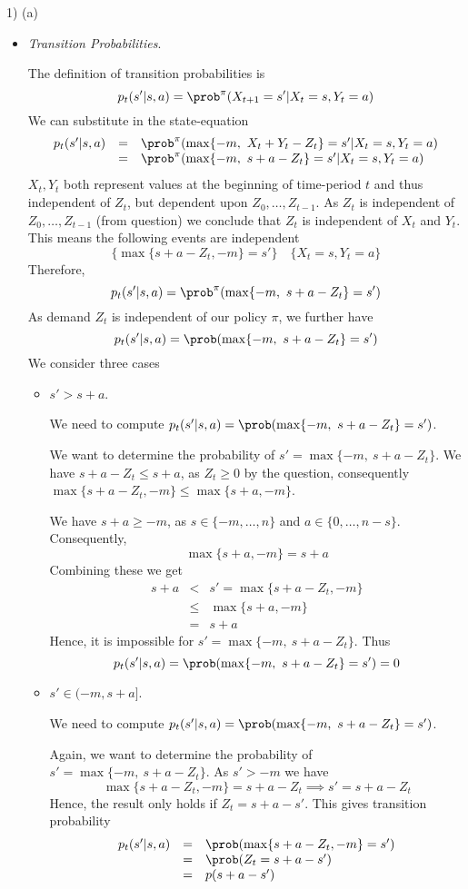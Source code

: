 \documentclass[11pt,a4paper]{article}
\begin{document}
\begin{answer}{1) (a)}
\begin{itemize}
    \item \textit{Transition Probabilities}.
    \par The definition of transition probabilities is
    \[ p_t(s'|s,a)=\prob^\pi(X_{t+1}=s'|X_t=s,Y_t=a) \]
    We can substitute in the state-equation
    \[\begin{array}{rcl}
      p_t(s'|s,a)&=&\prob^\pi(\max\{-m,\ X_t+Y_t-Z_t\}=s'|X_t=s,Y_t=a)\\
      &=&\prob^\pi(\max\{-m,\ s+a-Z_t\}=s'|X_t=s,Y_t=a)
    \end{array}\]
    $X_t,Y_t$ both represent values at the beginning of time-period $t$ and thus independent of $Z_t$, but dependent upon $Z_0,\dots,Z_{t-1}$. As $Z_t$ is independent of $Z_0,\dots,Z_{t-1}$ (from question) we conclude that $Z_t$ is independent of $X_t$ and $Y_t$. This means the following events are independent
    \[ \big\{\max\{s+a-Z_t,-m\}=s'\big\}\quad\big\{X_t=s,Y_t=a\big\} \]
    Therefore,
    \[ p_t(s'|s,a)=\prob^\pi(\max\{-m,\ s+a-Z_t\}=s') \]
    As demand $Z_t$ is independent of our policy $\pi$, we further have
    \[ p_t(s'|s,a)=\prob(\max\{-m,\ s+a-Z_t\}=s') \]
    We consider three cases
    \begin{itemize}
      \item $s'>s+a$.
      \par We need to compute $p_t(s'|s,a)=\prob(\max\{-m,\ s+a-Z_t\}=s')$.
      \par We want to determine the probability of $s'=\max\{-m,\ s+a-Z_t\}$. We have $s+a-Z_t\leq s+a$, as $Z_t\geq0$ by the question, consequently $\max\{s+a-Z_t,-m\}\leq\max\{s+a,-m\}$.
      \par We have $s+a\geq-m$, as $s\in\{-m,\dots,n\}$ and $a\in\{0,\dots,n-s\}$. Consequently,
      \[ \max\{s+a,-m\}=s+a \]
      Combining these we get
      \[\begin{array}{rcl}
        s+a&<&s'=\max\{s+a-Z_t,-m\}\\
        &\leq&\max\{s+a,-m\}\\
        &=&s+a
      \end{array}\]
      Hence, it is impossible for $s'=\max\{-m,\ s+a-Z_t\}$. Thus
      \[ p_t(s'|s,a)=\prob(\max\{-m,\ s+a-Z_t\}=s')=0 \]

      \item $s'\in(-m,s+a]$.
      \par We need to compute $p_t(s'|s,a)=\prob(\max\{-m,\ s+a-Z_t\}=s')$.
      \par Again, we want to determine the probability of $s'=\max\{-m,\ s+a-Z_t\}$. As $s'>-m$ we have
      \[ \max\{s+a-Z_t,-m\}=s+a-Z_t \implies s'=s+a-Z_t \]
      Hence, the result only holds if $Z_t=s+a-s'$. This gives transition probability
      \[\begin{array}{rcl}
        p_t(s'|s,a)&=&\prob(\max\{s+a-Z_t,-m\}=s')\\
        &=&\prob(Z_t=s+a-s')\\
        &=&p(s+a-s')
      \end{array}\]


\end{itemize}
\end{itemize}
\end{answer}
\end{document}
